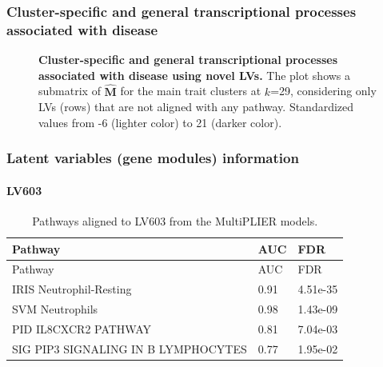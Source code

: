 \documentclass[
  a4paper,
]{article}
\newenvironment{fignos:tagged-figure}[1][]{
  \let\oldfigurename\figurename
  \renewcommand{\figurename}{Supplementary Figure}
}{
  \let\figurename\oldfigurename
}
\newenvironment{tablenos:tagged-table}[1][]{
  \let\oldtablename\tablename
  \renewcommand{\tablename}{Supplementary Table}
}{
  \let\tablename\oldtablename
}
\begin{document}
\clearpage

\hypertarget{cluster-specific-and-general-transcriptional-processes-associated-with-disease}{%
\subsubsection{Cluster-specific and general transcriptional processes associated with disease}\label{cluster-specific-and-general-transcriptional-processes-associated-with-disease}}

\begin{fignos:tagged-figure}[S14]

\begin{figure}
\hypertarget{fig:sup:clustering:novel:heatmap}{%
\centering

\caption{\textbf{Cluster-specific and general transcriptional processes associated with disease using novel LVs.}
The plot shows a submatrix of \(\hat{\mathbf{M}}\) for the main trait clusters at \(k\)=29, considering only LVs (rows) that are not aligned with any pathway.
Standardized values from -6 (lighter color) to 21 (darker color).}\label{fig:sup:clustering:novel:heatmap}
}
\end{figure}

\end{fignos:tagged-figure}

\clearpage

\hypertarget{latent-variables-gene-modules-information}{%
\subsubsection{Latent variables (gene modules) information}\label{latent-variables-gene-modules-information}}

\hypertarget{lv603}{%
\paragraph{LV603}\label{lv603}}

\begin{tablenos:tagged-table}[S3]

\begin{longtable}[]{@{}lll@{}}
\caption{Pathways aligned to LV603 from the MultiPLIER models.
\label{tbl:sup:multiplier_pathways:lv603}}\label{tbl:sup:multiplier_pathways:lv603}\tabularnewline
\toprule()
Pathway & AUC & FDR \\
\midrule()
\endfirsthead
\toprule()
Pathway & AUC & FDR \\
\midrule()
\endhead
IRIS Neutrophil-Resting & 0.91 & 4.51e-35 \\
SVM Neutrophils & 0.98 & 1.43e-09 \\
PID IL8CXCR2 PATHWAY & 0.81 & 7.04e-03 \\
SIG PIP3 SIGNALING IN B LYMPHOCYTES & 0.77 & 1.95e-02 \\
\bottomrule()
\end{longtable}

\end{tablenos:tagged-table}
\end{document}
